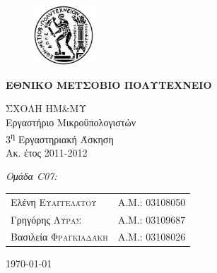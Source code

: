\begin{titlepage}
\begin{center}
\begin{figure}[h] 
     \includegraphics[width=0.2\textwidth]{title/ntua_logo}
\end{figure}
\vspace{1cm}
\begin{LARGE}\textbf{ΕΘΝΙΚΟ ΜΕΤΣΟΒΙΟ ΠΟΛΥΤΕΧΝΕΙΟ\\[1.5cm]}\end{LARGE}
\begin{Large}
ΣΧΟΛΗ ΗΜ\&ΜΥ\\
Εργαστήριο Μικροϋπολογιστών\\[2cm]
3\textsuperscript{η} Εργαστηριακή Άσκηση\\
Ακ. έτος 2011-2012\\
\end{Large}
\vfill
\begin{flushright}
\Large \textit{Ομάδα C07:}\\[1cm]
\begin{tabular}{l r}
{Ελένη \textsc{Ευαγγελάτου}}&
{Α.Μ.: 03108050}\\
{Γρηγόρης \textsc{Λύρας}}&
{Α.Μ.: 03109687}\\
{Βασιλεία \textsc{Φραγκιαδάκη}}&
{Α.Μ.: 03108026}\\
\end{tabular}
\end{flushright}

\large\today\\
\end{center}
\end{titlepage}


